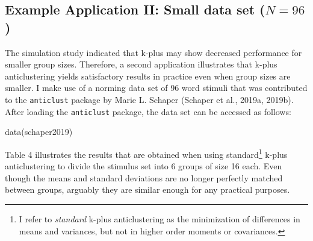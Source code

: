 \documentclass[
  man,floatsintext]{apa7}
\newenvironment{Shaded}{\begin{snugshade}}{\end{snugshade}}
\newcommand{\FunctionTok}[1]{\textcolor[rgb]{0.00,0.00,0.00}{#1}}
\newcommand{\NormalTok}[1]{#1}
\begin{document}
\hypertarget{example-application-ii-small-data-set-n-96}{%
\subsection{\texorpdfstring{Example Application II: Small data set (\(N = 96\))}{Example Application II: Small data set (N = 96)}}\label{example-application-ii-small-data-set-n-96}}

The simulation study indicated that k-plus may show decreased performance for smaller group sizes. Therefore, a second application illustrates that k-plus anticlustering yields satisfactory results in practice even when group sizes are smaller. I make use of a norming data set of 96 word stimuli that was contributed to the \texttt{anticlust} package by Marie L. Schaper (Schaper et al., 2019a, 2019b). After loading the \texttt{anticlust} package, the data set can be accessed as follows:

\begin{Shaded}
\begin{Highlighting}[]
\FunctionTok{data}\NormalTok{(schaper2019)}
\end{Highlighting}
\end{Shaded}

Table 4 illustrates the results that are obtained when using standard\footnote{I refer to \emph{standard} k-plus anticlustering as the minimization of differences in means and variances, but not in higher order moments or covariances.} k-plus anticlustering to divide the stimulus set into 6 groups of size 16 each. Even though the means and standard deviations are no longer perfectly matched between groups, arguably they are similar enough for any practical purposes.
\end{document}
